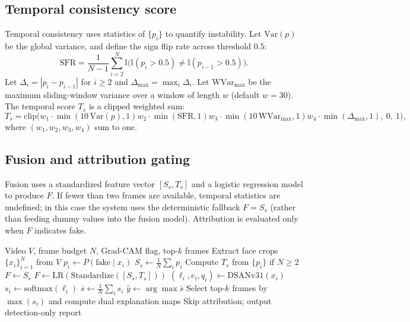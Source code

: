 \documentclass[conference]{IEEEtran}
\begin{document}
\subsection{Temporal consistency score}
Temporal consistency uses statistics of $\{p_i\}$ to quantify instability. Let $\mathrm{Var}(p)$ be the global variance, and define the sign flip rate across threshold $0.5$:
\begin{equation}
\mathrm{SFR} = \frac{1}{N-1}\sum_{i=2}^{N} \mathbb{I}\Big(\mathbb{I}(p_i>0.5)\neq \mathbb{I}(p_{i-1}>0.5)\Big).
\end{equation}
Let $\Delta_i = |p_i - p_{i-1}|$ for $i\ge 2$ and $\Delta_{\max} = \max_i \Delta_i$. Let $\mathrm{WVar}_{\max}$ be the maximum sliding-window variance over a window of length $w$ (default $w=30$). The temporal score $T_s$ is a clipped weighted sum:
\begin{equation}
T_s = \mathrm{clip}\Big(
w_1 \cdot \min(10\,\mathrm{Var}(p),1)
w_2 \cdot \min(\mathrm{SFR},1)
w_3 \cdot \min(10\,\mathrm{WVar}_{\max},1)
w_4 \cdot \min(\Delta_{\max},1),\ 0,\ 1
\Big),
\end{equation}
where $(w_1,w_2,w_3,w_4)$ sum to one.

\subsection{Fusion and attribution gating}
Fusion uses a standardized feature vector $[S_s, T_s]$ and a logistic regression model to produce $F$. If fewer than two frames are available, temporal statistics are undefined; in this case the system uses the deterministic fallback $F=S_s$ (rather than feeding dummy values into the fusion model). Attribution is evaluated only when $F$ indicates fake.

\begin{algorithm}[t]
\caption{End-to-end inference with fusion-gated attribution}
\label{alg:pipeline}
\begin{algorithmic}[1]
\REQUIRE Video $V$, frame budget $N$, Grad-CAM flag, top-$k$ frames
\STATE Extract face crops $\{x_i\}_{i=1}^{N}$ from $V$
  \STATE $p_i \leftarrow P(\mathrm{fake}\mid x_i)$
\ENDFOR
\STATE $S_s \leftarrow \frac{1}{N}\sum_i p_i$
\STATE Compute $T_s$ from $\{p_i\}$ if $N\ge 2$
  \STATE $F \leftarrow S_s$
\ELSE
  \STATE $F \leftarrow \mathrm{LR}(\mathrm{Standardize}([S_s,T_s]))$
\ENDIF
{}
    \STATE $(\ell_i, e_i, q_i) \leftarrow \mathrm{DSANv31}(x_i)$
    \STATE $s_i \leftarrow \mathrm{softmax}(\ell_i)$
  \ENDFOR
  \STATE $\bar{s} \leftarrow \frac{1}{N}\sum_i s_i$
  \STATE $\hat{y} \leftarrow \arg\max \bar{s}$
    \STATE Select top-$k$ frames by $\max(s_i)$ and compute dual explanation maps
  \ENDIF
\ELSE
  \STATE Skip attribution; output detection-only report
\ENDIF
\end{algorithmic}
\end{algorithm}
\end{document}
